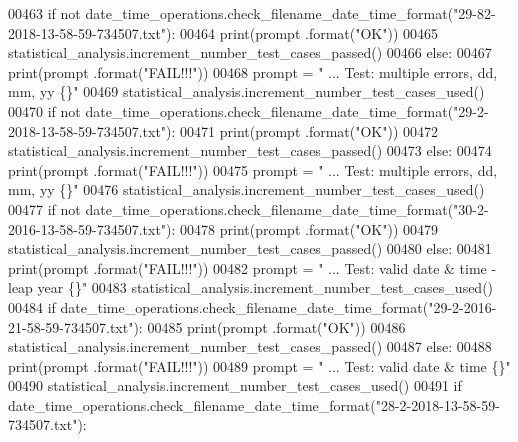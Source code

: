 \begin{DoxyCode}
00463         \textcolor{keywordflow}{if} \textcolor{keywordflow}{not} date\_time\_operations.check\_filename\_date\_time\_format(\textcolor{stringliteral}{"29-82-2018-13-58-59-734507.txt"}):
00464             print(prompt .format(\textcolor{stringliteral}{"OK"}))
00465             statistical\_analysis.increment\_number\_test\_cases\_passed()
00466         \textcolor{keywordflow}{else}:
00467             print(prompt .format(\textcolor{stringliteral}{"FAIL!!!"}))
00468         prompt = \textcolor{stringliteral}{"  ... Test: multiple errors, dd, mm, yy           \{\}"}
00469         statistical\_analysis.increment\_number\_test\_cases\_used()
00470         \textcolor{keywordflow}{if} \textcolor{keywordflow}{not} date\_time\_operations.check\_filename\_date\_time\_format(\textcolor{stringliteral}{"29-2-2018-13-58-59-734507.txt"}):
00471             print(prompt .format(\textcolor{stringliteral}{"OK"}))
00472             statistical\_analysis.increment\_number\_test\_cases\_passed()
00473         \textcolor{keywordflow}{else}:
00474             print(prompt .format(\textcolor{stringliteral}{"FAIL!!!"}))
00475         prompt = \textcolor{stringliteral}{"  ... Test: multiple errors, dd, mm, yy           \{\}"}
00476         statistical\_analysis.increment\_number\_test\_cases\_used()
00477         \textcolor{keywordflow}{if} \textcolor{keywordflow}{not} date\_time\_operations.check\_filename\_date\_time\_format(\textcolor{stringliteral}{"30-2-2016-13-58-59-734507.txt"}):
00478             print(prompt .format(\textcolor{stringliteral}{"OK"}))
00479             statistical\_analysis.increment\_number\_test\_cases\_passed()
00480         \textcolor{keywordflow}{else}:
00481             print(prompt .format(\textcolor{stringliteral}{"FAIL!!!"}))
00482         prompt = \textcolor{stringliteral}{"  ... Test: valid date & time - leap year         \{\}"}
00483         statistical\_analysis.increment\_number\_test\_cases\_used()
00484         \textcolor{keywordflow}{if} date\_time\_operations.check\_filename\_date\_time\_format(\textcolor{stringliteral}{"29-2-2016-21-58-59-734507.txt"}):
00485             print(prompt .format(\textcolor{stringliteral}{"OK"}))
00486             statistical\_analysis.increment\_number\_test\_cases\_passed()
00487         \textcolor{keywordflow}{else}:
00488             print(prompt .format(\textcolor{stringliteral}{"FAIL!!!"}))
00489         prompt = \textcolor{stringliteral}{"  ... Test: valid date & time             \{\}"}
00490         statistical\_analysis.increment\_number\_test\_cases\_used()
00491         \textcolor{keywordflow}{if} date\_time\_operations.check\_filename\_date\_time\_format(\textcolor{stringliteral}{"28-2-2018-13-58-59-734507.txt"}):

\end{DoxyCode}
